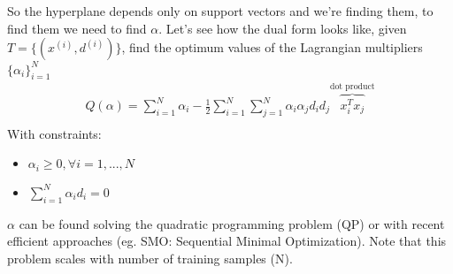 \documentclass[12pt]{book}
\begin{document}
\newline
So the hyperplane depends only on support vectors and we're finding them, to find them we need to find $\alpha$. 
\newline\newline
Let's see how the dual form looks like, given $T = \{(x^{(i)}, d^{(i)})\}$, find the optimum values of the Lagrangian multipliers $\{\alpha_i\}^N_{i=1}$ 
\begin{equation}
	\begin{aligned}
		Q(\alpha) = \sum_{i=1}^N \alpha_i - \frac{1}{2}\sum_{i=1}^N\sum_{j=1}^N \alpha_i\alpha_jd_{i}d_{j}\overbrace{x_{i}^Tx_{j}}^\text{dot product} \\
	\end{aligned}
\end{equation}
With constraints:
\begin{itemize}
	\item $\alpha_i \geq 0, \forall i = 1,...,N$
	\item $\sum_{i=1}^N \alpha_i d_i = 0$
\end{itemize}
$\alpha$ can be found solving the quadratic programming problem (QP) or with recent efficient approaches (eg. SMO: Sequential Minimal Optimization). Note that this problem scales with number of training samples (N).
\end{document}

